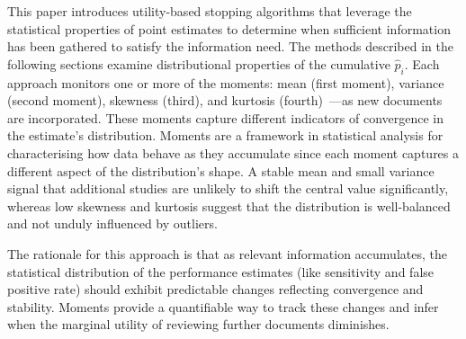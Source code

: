 \documentclass[sigconf,natbib=true,anonymous=true]{acmart}
\begin{document}
This paper introduces utility-based stopping algorithms that leverage the statistical properties of point estimates to determine when sufficient information has been gathered to satisfy the information need. The methods described in the following sections examine distributional properties of the cumulative $\hat{p}_i$. Each approach monitors one or more of the moments: mean (first moment), variance (second moment), skewness (third), and kurtosis (fourth)~\cite{blanca_skewness_2013, wackerly2008mathematical}—as new documents are incorporated. These moments capture different indicators of convergence in the estimate's distribution. Moments are a framework in statistical analysis for characterising how data behave as they accumulate since each moment captures a different aspect of the distribution’s shape. A stable mean and small variance signal that additional studies are unlikely to shift the central value significantly, whereas low skewness and kurtosis suggest that the distribution is well-balanced and not unduly influenced by outliers.

The rationale for this approach is that as relevant information accumulates, the statistical distribution of the performance estimates (like sensitivity and false positive rate) should exhibit predictable changes reflecting convergence and stability. Moments provide a quantifiable way to track these changes and infer when the marginal utility of reviewing further documents diminishes.





\end{document}
